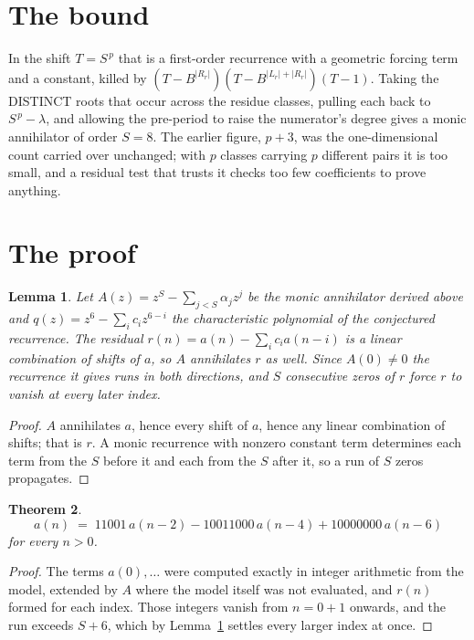 \documentclass[11pt,a4paper]{article}
\theoremstyle{plain}
\newtheorem{theorem}{Theorem}
\newtheorem{lemma}[theorem]{Lemma}
\theoremstyle{definition}
\begin{document}
\section{The bound}

In the shift $T=S^{\,p}$ that is a first-order recurrence with a geometric forcing term and a
constant, killed by $(T-B^{|R_r|})(T-B^{|L_r|+|R_r|})(T-1)$. Taking the DISTINCT roots that
occur across the residue classes, pulling each back to $S^{\,p}-\lambda$, and allowing the
pre-period to raise the numerator's degree gives a monic annihilator of order $S=8$. The
earlier figure, $p+3$, was the one-dimensional count carried over unchanged; with $p$ classes
carrying $p$ different pairs it is too small, and a residual test that trusts it checks too few
coefficients to prove anything.

\section{The proof}

\begin{lemma}\label{lem:crit}
Let $A(z)=z^S-\sum_{j<S}\alpha_jz^{j}$ be the monic annihilator derived above and
$q(z)=z^{6}-\sum_ic_iz^{6-i}$ the characteristic polynomial of the conjectured
recurrence. The residual $r(n)=a(n)-\sum_ic_ia(n-i)$ is a linear combination of shifts of $a$,
so $A$ annihilates $r$ as well. Since $A(0)\ne0$ the recurrence it gives runs in both
directions, and $S$ consecutive zeros of $r$ force $r$ to vanish at every later index.
\end{lemma}

\begin{proof}
$A$ annihilates $a$, hence every shift of $a$, hence any linear combination of shifts; that is
$r$. A monic recurrence with nonzero constant term determines each term from the $S$ before it
and each from the $S$ after it, so a run of $S$ zeros propagates.
\end{proof}

\begin{theorem}
\[
a(n)\;=\;11001\,a(n-2) - 10011000\,a(n-4) + 10000000\,a(n-6)
\]
for every $n>0$.
\end{theorem}

\begin{proof}
The terms $a(0),\dots$ were computed exactly in integer arithmetic from the model, extended by
$A$ where the model itself was not evaluated, and $r(n)$ formed for each index. Those integers
vanish from $n=0+1$ onwards, and the run exceeds $S+6$, which by
Lemma~\ref{lem:crit} settles every larger index at once.
\end{proof}
\end{document}
